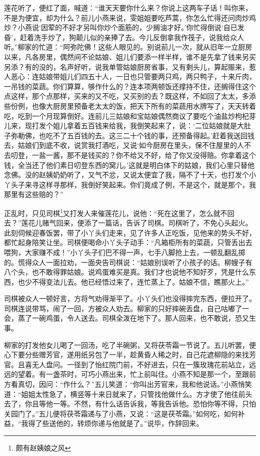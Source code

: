 \documentclass[12pt,oneside]{book}
\begin{document}
莲花听了，便红了面，喊道：“谁天天要你什么来？你说上这两车子话！叫你来，不是为便宜，却为什么？前儿小燕来说，雯姐姐要吃芦蒿，你怎么忙得还问肉炒鸡炒？小燕说‘因荤的不好才另叫你炒个面筋的，少搁油才好。’你忙得倒说‘自已发昏’，赶着洗手炒了，狗颠儿似的亲捧了去。今儿反倒拿我作筏子，说我给众人听。”柳家的忙道：“阿弥陀佛！这些人眼见的。别说前儿一次，就从旧年一立厨房以来，凡各房里，偶然间不论姑娘、姐儿们要添一样半样，谁不是先拿了钱来另买另添？有的没的，名声好听，说我单管姑娘厨房省事，又有剩头儿，算起赈来，惹人恶心：连姑娘带姐儿们四五十人，一日也只管要两只鸡，两只鸭子，十来斤肉，一吊钱的菜蔬。你们算算，够作什么的？连本项两顿饭还撑持不住，还搁得住这个点这样，那个点那样，买来的又不吃，又买别的去？既这样，不如回了太太，多添些份例，也像大厨房里预备老太太的饭，把天下所有的菜蔬用水牌写了，天天转着吃，吃到一个月现算倒好。连前儿三姑娘和宝姑娘偶然商议了要吃个油盐炒枸杞芽儿来，现打发个姐儿拿着五百钱来给我，我倒笑起来了，说：‘二位姑娘就是大肚子弥勒佛，也吃不了五百钱的去。这三二十个钱的事，还预备得起。’赶着我送回钱去，姑娘们到底不收，说赏我打酒吃，又说‘如今厨房在里头，保不住屋里的人不去叨登，一盐一酱，那不是钱买的？你不给又不好，给了你又没得赔。你拿着这个钱，全当还了他们素日叨登东西的窝儿。’这就是明白体下的姑娘，我们心里只替他念佛。没的赵姨奶奶听了，又气不忿，又说太便宜了我，隔不了十天，也打发个小丫头子来寻这样寻那样，我倒好笑起来。你们竟成了例，不是这个，就是那个，我那里有这些赔的？”

正乱时，只见司棋\footnote{颇有赵姨娘之风}又打发人来催莲花儿，说他：“死在这里了，怎么就不回去？”莲花儿赌气回来，便添了一篇话，告诉了司棋。司棋听了，不免心头起火。此刻伺候迎春饭罢，带了小丫头们走来，见了许多人正吃饭，见他来的势头不好，都忙起身陪笑让坐。司棋便喝命小丫头子动手：“凡箱柜所有的菜蔬，只管丢出去喂狗，大家赚不成！”小丫头子们巴不得一声，七手八脚抢上去，一顿乱翻乱掷的。慌得众人一面拉劝，一面央告司棋说：“姑娘别误听了小孩子的话。柳嫂子有八个头，也不敢得罪姑娘。说鸡蛋难买是真。我们才也说他不知好歹，凭是什么东西，也少不得变法儿去。他已经悟过来了，连忙蒸上了。姑娘不信，瞧那火上。”

司棋被众人一顿好言，方将气劝得渐平了。小丫头们也没得摔完东西，便拉开了。司棋连说带骂，闹了一回，方被众人劝去。柳家的只好摔碗丢盘，自己咕嘟了一会，蒸了一碗鸡蛋，令人送去。司棋全泼在地下了。那人回来，也不敢说，恐又生事。

柳家的打发他女儿喝了一回汤，吃了半碗粥，又将茯苓霜一节说了。五儿听罢，便心下要分些赠芳官，遂用纸另包了一半，趁黄昏人稀之时，自己花遮柳隐的来找芳官。且喜无人盘问。一径到了怡红院门前，不好进去，只在一簇玫瑰花前站立，远远的望着。有一盏茶时，可巧小燕出来，忙上前叫住。小燕不知是那一个，至跟前方看真切，因问：“作什么？”五儿笑道：“你叫出芳官来，我和他说话。”小燕悄笑道：“姐姐太性急了，横竖等十来日就来了，只管找他做什么。方才使了他往前头去了，你且等他一等。不然，有什么话告诉我，等我告诉他。恐怕你等不得，只怕关园门了。”五儿便将茯苓霜递与了小燕，又说：“这是茯苓霜。”如何吃，如何补益，“我得了些送他的，转烦你递与他就是了。”说毕，作辞回来。
\end{document}
